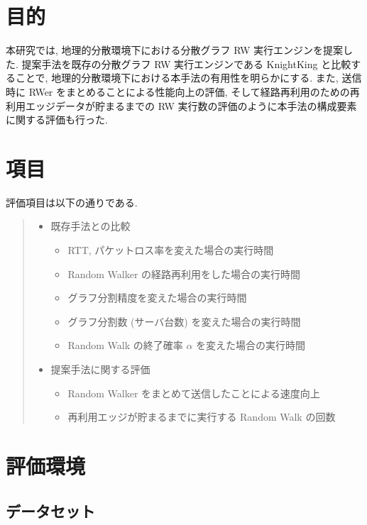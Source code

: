 \section{目的}
本研究では, 地理的分散環境下における分散グラフ RW 実行エンジンを提案した. 提案手法を既存の分散グラフ RW 実行エンジンである KnightKing \cite{10.1145/3341301.3359634} と比較することで, 地理的分散環境下における本手法の有用性を明らかにする. また, 送信時に RWer をまとめることによる性能向上の評価, そして経路再利用のための再利用エッジデータが貯まるまでの RW 実行数の評価のように本手法の構成要素に関する評価も行った. 

\section{項目}

評価項目は以下の通りである. 
\begin{quote}
    \begin{itemize}
        \item 既存手法との比較
        \begin{itemize}
            \item RTT, パケットロス率を変えた場合の実行時間
            \item Random Walker の経路再利用をした場合の実行時間
            \item グラフ分割精度を変えた場合の実行時間
            \item グラフ分割数 (サーバ台数) を変えた場合の実行時間
            \item Random Walk の終了確率 $\alpha$ を変えた場合の実行時間
        \end{itemize}
        \item 提案手法に関する評価
        \begin{itemize}
            \item Random Walker をまとめて送信したことによる速度向上
            \item 再利用エッジが貯まるまでに実行する Random Walk の回数
        \end{itemize}
    \end{itemize}
\end{quote}

\section{評価環境}

\subsection{データセット}

